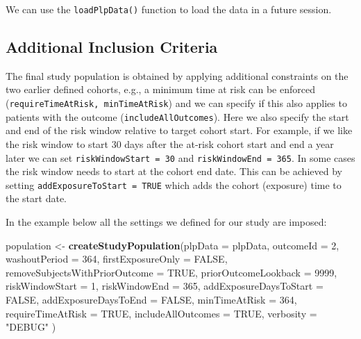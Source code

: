 \documentclass[11pt]{book}
\newenvironment{Shaded}{\begin{snugshade}}{\end{snugshade}}
\newcommand{\KeywordTok}[1]{\textcolor[rgb]{0.13,0.29,0.53}{\textbf{#1}}}
\newcommand{\DataTypeTok}[1]{\textcolor[rgb]{0.13,0.29,0.53}{#1}}
\newcommand{\DecValTok}[1]{\textcolor[rgb]{0.00,0.00,0.81}{#1}}
\newcommand{\StringTok}[1]{\textcolor[rgb]{0.31,0.60,0.02}{#1}}
\newcommand{\OtherTok}[1]{\textcolor[rgb]{0.56,0.35,0.01}{#1}}
\newcommand{\NormalTok}[1]{#1}
\theoremstyle{definition}
\theoremstyle{definition}
\theoremstyle{definition}
\theoremstyle{remark}
\begin{document}
We can use the \texttt{loadPlpData()} function to load the data in a
future session.

\subsection{Additional Inclusion
Criteria}\label{additional-inclusion-criteria}

The final study population is obtained by applying additional
constraints on the two earlier defined cohorts, e.g., a minimum time at
risk can be enforced (\texttt{requireTimeAtRisk,\ minTimeAtRisk}) and we
can specify if this also applies to patients with the outcome
(\texttt{includeAllOutcomes}). Here we also specify the start and end of
the risk window relative to target cohort start. For example, if we like
the risk window to start 30 days after the at-risk cohort start and end
a year later we can set \texttt{riskWindowStart\ =\ 30} and
\texttt{riskWindowEnd\ =\ 365}. In some cases the risk window needs to
start at the cohort end date. This can be achieved by setting
\texttt{addExposureToStart\ =\ TRUE} which adds the cohort (exposure)
time to the start date.

In the example below all the settings we defined for our study are
imposed:

\begin{Shaded}
\begin{Highlighting}[]
\NormalTok{population <-}\StringTok{ }\KeywordTok{createStudyPopulation}\NormalTok{(}\DataTypeTok{plpData =}\NormalTok{ plpData,}
                                    \DataTypeTok{outcomeId =} \DecValTok{2}\NormalTok{,}
                                    \DataTypeTok{washoutPeriod =} \DecValTok{364}\NormalTok{,}
                                    \DataTypeTok{firstExposureOnly =} \OtherTok{FALSE}\NormalTok{,}
                                    \DataTypeTok{removeSubjectsWithPriorOutcome =} \OtherTok{TRUE}\NormalTok{,}
                                    \DataTypeTok{priorOutcomeLookback =} \DecValTok{9999}\NormalTok{,}
                                    \DataTypeTok{riskWindowStart =} \DecValTok{1}\NormalTok{,}
                                    \DataTypeTok{riskWindowEnd =} \DecValTok{365}\NormalTok{,}
                                    \DataTypeTok{addExposureDaysToStart =} \OtherTok{FALSE}\NormalTok{,}
                                    \DataTypeTok{addExposureDaysToEnd =} \OtherTok{FALSE}\NormalTok{,}
                                    \DataTypeTok{minTimeAtRisk =} \DecValTok{364}\NormalTok{,}
                                    \DataTypeTok{requireTimeAtRisk =} \OtherTok{TRUE}\NormalTok{,}
                                    \DataTypeTok{includeAllOutcomes =} \OtherTok{TRUE}\NormalTok{,}
                                    \DataTypeTok{verbosity =} \StringTok{"DEBUG"}
\NormalTok{)}
\end{Highlighting}
\end{Shaded}
\end{document}
